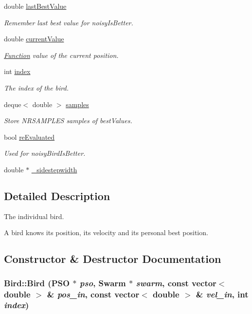 \begin{CompactItemize}
double \hyperlink{classBird_b37696e9097c484dac6b72f8dfb94ab6}{lastBestValue}
\begin{CompactList}\small\item\em Remember last best value for noisyIsBetter. \item\end{CompactList}\item 
double \hyperlink{classBird_7f3f0ebbdf398c6d71898fa21135777a}{currentValue}
\begin{CompactList}\small\item\em \hyperlink{classFunction}{Function} value of the current position. \item\end{CompactList}\item 
int \hyperlink{classBird_43bfb452fe35adad0d607b46fcd0d8cc}{index}
\begin{CompactList}\small\item\em The index of the bird. \item\end{CompactList}\item 
deque$<$ double $>$ \hyperlink{classBird_cfe288b379ff142fde1e46df598c79b3}{samples}
\begin{CompactList}\small\item\em Store NRSAMPLES samples of bestValues. \item\end{CompactList}\item 
bool \hyperlink{classBird_450369f9a336c54c757ab789bd89a405}{reEvaluated}
\begin{CompactList}\small\item\em Used for noisyBirdIsBetter. \item\end{CompactList}\item 
double $\ast$ \hyperlink{classBird_4f3eb3475988373f5339123f09bda050}{\_\-sidestepwidth}
\end{CompactItemize}


\subsection{Detailed Description}
The individual bird. 

A bird knows its position, its velocity and its personal best position. 

\subsection{Constructor \& Destructor Documentation}
\hypertarget{classBird_c609549ab3719aba052ee9fb1d647575}{
\subsubsection{\setlength{\rightskip}{0pt plus 5cm}Bird::Bird ({\bf PSO} $\ast$ {\em pso}, \/  {\bf Swarm} $\ast$ {\em swarm}, \/  const vector$<$ double $>$ \& {\em pos\_\-in}, \/  const vector$<$ double $>$ \& {\em vel\_\-in}, \/  int {\em index})}}
\label{classBird_c609549ab3719aba052ee9fb1d647575}


